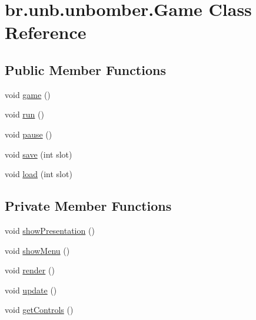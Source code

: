 \hypertarget{classbr_1_1unb_1_1unbomber_1_1_game}{\section{br.\+unb.\+unbomber.\+Game Class Reference}
\label{classbr_1_1unb_1_1unbomber_1_1_game}
}
\subsection*{Public Member Functions}
\begin{DoxyCompactItemize}
\item 
void \hyperlink{classbr_1_1unb_1_1unbomber_1_1_game_a151cbfd66dbb0b02286ce55f8e102b5f}{game} ()
\item 
void \hyperlink{classbr_1_1unb_1_1unbomber_1_1_game_a08c83c60b7e0ed1310866c08f62361e0}{run} ()
\item 
void \hyperlink{classbr_1_1unb_1_1unbomber_1_1_game_adcca8696c7688ef1f2dd0e7f758bd3f5}{pause} ()
\item 
void \hyperlink{classbr_1_1unb_1_1unbomber_1_1_game_a9fc1f9c219d5f861531a3f8bbeb711fe}{save} (int slot)
\item 
void \hyperlink{classbr_1_1unb_1_1unbomber_1_1_game_a114ff334894eaa3e95ec7c6c70e84b68}{load} (int slot)
\end{DoxyCompactItemize}
\subsection*{Private Member Functions}
\begin{DoxyCompactItemize}
\item 
void \hyperlink{classbr_1_1unb_1_1unbomber_1_1_game_a4c2a2a0247732121e114c07baed210e0}{show\+Presentation} ()
\item 
void \hyperlink{classbr_1_1unb_1_1unbomber_1_1_game_a26e0fbd01f411e76ab437f3bebbce58e}{show\+Menu} ()
\item 
void \hyperlink{classbr_1_1unb_1_1unbomber_1_1_game_aa6a183dde3a46ab2fab7689677673a45}{render} ()
\item 
void \hyperlink{classbr_1_1unb_1_1unbomber_1_1_game_a6bb97357d0f43d2e13014b3cff4a340e}{update} ()
\item 
void \hyperlink{classbr_1_1unb_1_1unbomber_1_1_game_a0b0432715522116b26643aa8dd745ce4}{get\+Controls} ()
\end{DoxyCompactItemize}


